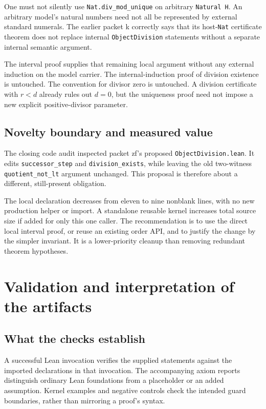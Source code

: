 \documentclass[11pt,letterpaper]{article}
\newcommand{\code}[1]{{\small\urlstyle{tt}\nolinkurl{#1}}}
\newcommand{\module}[1]{\code{#1.lean}}
\begin{document}
One must not silently use \code{Nat.div_mod_unique} on arbitrary \code{Natural H}. An arbitrary model's natural numbers need not all be represented by external standard numerals. The earlier packet k correctly says that its host-\code{Nat} certificate theorem does not replace internal \code{ObjectDivision} statements without a separate internal semantic argument.

The interval proof supplies that remaining local argument without any external induction on the model carrier. The internal-induction proof of division existence is untouched. The convention for divisor zero is untouched. A division certificate with $r<d$ already rules out $d=0$, but the uniqueness proof need not impose a new explicit positive-divisor parameter.

\subsection{Novelty boundary and measured value}

The closing code audit inspected packet zf's proposed \module{ObjectDivision}. It edits \code{successor_step} and \code{division_exists}, while leaving the old two-witness \code{quotient_not_lt} argument unchanged. This proposal is therefore about a different, still-present obligation.

The local declaration decreases from eleven to nine nonblank lines, with no new production helper or import. A standalone reusable kernel increases total source size if added for only this one caller. The recommendation is to use the direct local interval proof, or reuse an existing order API, and to justify the change by the simpler invariant. It is a lower-priority cleanup than removing redundant theorem hypotheses.

\section{Validation and interpretation of the artifacts}
\label{sec:validation}



\subsection{What the checks establish}

A successful Lean invocation verifies the supplied statements against the imported declarations in that invocation. The accompanying axiom reports distinguish ordinary Lean foundations from a placeholder or an added assumption. Kernel examples and negative controls check the intended guard boundaries, rather than mirroring a proof's syntax.
\end{document}
